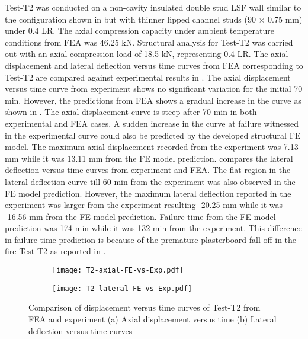 Test-T2 was conducted on a non-cavity insulated double stud LSF wall similar to the configuration shown in  but with thinner lipped channel studs (90 $\times$ 0.75 mm) under 0.4 LR. The axial compression capacity under ambient temperature conditions from FEA was 46.25 kN. Structural analysis for Test-T2 was carried out with an axial compression load of 18.5 kN, representing 0.4 LR. The axial displacement and lateral deflection versus time curves from FEA corresponding to Test-T2 are compared against experimental results in . The axial displacement versus time curve from experiment shows no significant variation for the initial 70 min. However, the predictions from FEA shows a gradual increase in the curve as shown in . The axial displacement curve is steep after 70 min in both experimental and FEA cases. A sudden increase in the curve at failure witnessed in the experimental curve could also be predicted by the developed structural FE model. The maximum axial displacement recorded from the experiment was 7.13 mm while it was 13.11 mm from the FE model prediction.  compares the lateral deflection versus time curves from experiment and FEA. The flat region in the lateral deflection curve till 60 min from the experiment was also observed in the FE model prediction. However, the maximum lateral deflection reported in the experiment was larger from the experiment resulting -20.25 mm while it was -16.56 mm from the FE model prediction. Failure time from the FE model prediction was 174 min while it was 132 min from the experiment. This difference in failure time prediction is because of the premature plasterboard fall-off in the fire Test-T2 as reported in .        
\begin{figure}[!htbp]
	\centering
	\begin{subfigure}[b]{0.7\textwidth}
		\centering
		\texttt{[image: T2-axial-FE-vs-Exp.pdf]}
		\caption{}
		\label{subfig:T2-axial-FE-vs-Exp}
	\end{subfigure}
	\begin{subfigure}[b]{0.7\textwidth}
		\centering
		\texttt{[image: T2-lateral-FE-vs-Exp.pdf]}
		\caption{}
		\label{subfig:T2-lateral-FE-vs-Exp}
	\end{subfigure}
	   \caption{Comparison of displacement versus time curves of Test-T2 from FEA and experiment (a) Axial displacement versus time (b) Lateral deflection versus time curves}
	   \label{fig:T2-structural-FE-vs-Exp}
\end{figure} 
